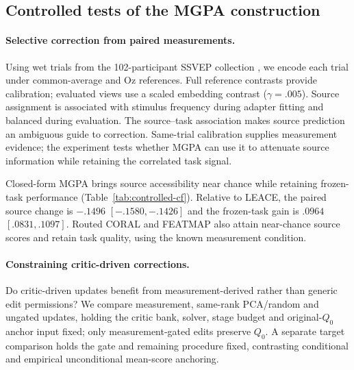 \subsection{Controlled tests of the MGPA construction}
\label{sec:gate-result}
\paragraph{Selective correction from paired measurements.}
Using wet trials from the 102-participant SSVEP collection \citep{zhu2021ssvep}, we
encode each trial under common-average and Oz references. Full reference
contrasts provide calibration; evaluated views use a scaled embedding
contrast ($\gamma=.005$). Source assignment is associated with stimulus
frequency during adapter fitting and balanced during evaluation.
The source--task association makes source prediction an ambiguous guide to
correction. Same-trial calibration supplies measurement evidence; the
experiment tests whether MGPA can use it to attenuate source information
while retaining the correlated task signal.

\begin{table}[htbp]
\centering\small
\caption{\textbf{Selective correction with a single analytic map.}
Controlled SSVEP at native endpoints: independent source AUROC,
frozen/refitted task AUROC and relative movement. All methods share a reader
realization over four rotations (81 distinct evaluation participants).
Source-aware rows require source identity.
Paired contrasts are in Appendix~\ref{app:closed-form-controlled}.}
\label{tab:controlled-cf}

\end{table}

Closed-form MGPA brings source accessibility near chance while retaining
frozen-task performance (Table~\ref{tab:controlled-cf}). Relative to LEACE,
the paired source
change is $-.1496$ $[-.1580,-.1426]$ and the frozen-task gain is $.0964$
$[.0831,.1097]$.
Routed CORAL and FEATMAP also attain near-chance source
scores and retain task quality, using the known measurement condition.

\paragraph{Constraining critic-driven corrections.}
Do critic-driven updates benefit from measurement-derived rather than
generic edit permissions? We compare measurement, same-rank PCA/random
and ungated updates, holding the critic bank, solver, stage budget and
original-$Q_0$ anchor input fixed; only measurement-gated edits preserve
$Q_0$. A separate target comparison holds the gate and remaining procedure
fixed, contrasting conditional and empirical unconditional mean-score anchoring.

